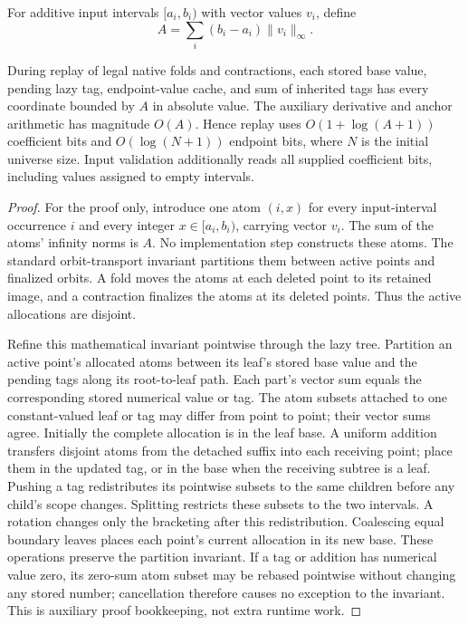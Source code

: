 For additive input intervals $[a_i,b_i)$ with vector values $v_i$, define
\[
 A=\sum_i(b_i-a_i)\lVert v_i\rVert_\infty.
\]
\begin{lemma}
\label{lem:lazy-bits}
During replay of legal native folds and contractions, each stored base
value, pending lazy tag, endpoint-value cache, and sum of inherited tags
has every coordinate bounded by $A$ in absolute value. The auxiliary
derivative and anchor arithmetic has magnitude $O(A)$. Hence replay uses
$O(1+\log(A+1))$ coefficient bits and $O(\log(N+1))$ endpoint bits, where
$N$ is the initial universe size. Input validation additionally reads all
supplied coefficient bits, including values assigned to empty intervals.
\end{lemma}
\begin{proof}
For the proof only, introduce one atom $(i,x)$ for every input-interval
occurrence $i$ and every integer $x\in[a_i,b_i)$, carrying vector $v_i$.
The sum of the atoms' infinity norms is $A$. No implementation step
constructs these atoms. The standard orbit-transport invariant partitions
them between active points and finalized orbits. A fold moves the atoms
at each deleted point to its retained image, and a contraction finalizes
the atoms at its deleted points. Thus the active allocations are disjoint.

Refine this mathematical invariant pointwise through the lazy tree.
Partition an active point's allocated atoms between its leaf's stored
base value and the pending tags along its root-to-leaf path. Each part's
vector sum equals the corresponding stored numerical value or tag.
The atom subsets attached to one constant-valued leaf or tag may differ
from point to point; their vector sums agree. Initially the complete
allocation is in the leaf base. A uniform addition transfers disjoint
atoms from the detached suffix into each receiving point; place them in
the updated tag, or in the base when the receiving subtree is a leaf.
Pushing a tag redistributes its pointwise subsets to the same children
before any child's scope changes. Splitting restricts these subsets to
the two intervals. A rotation changes only the bracketing after this
redistribution. Coalescing equal boundary leaves places each point's
current allocation in its new base. These operations preserve the
partition invariant. If a tag or addition has numerical value zero,
its zero-sum atom subset may be rebased pointwise without changing any
stored number; cancellation therefore causes no exception to the
invariant. This is auxiliary proof bookkeeping, not extra runtime work.


\end{proof}
